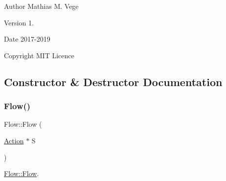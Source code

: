 \begin{DoxyAuthor}{Author}
Mathias M. Vege 
\end{DoxyAuthor}
\begin{DoxyVersion}{Version}
1. 
\end{DoxyVersion}
\begin{DoxyDate}{Date}
2017-\/2019 
\end{DoxyDate}
\begin{DoxyCopyright}{Copyright}
M\+IT Licence 
\end{DoxyCopyright}


\subsection{Constructor \& Destructor Documentation}
\mbox{\label{class_flow_a25ae85599c0ae330374f0840efde7ebc}} 
\subsubsection{\texorpdfstring{Flow()}{Flow()}}
{\footnotesize\ttfamily Flow\+::\+Flow (\begin{DoxyParamCaption}\item[{\mbox{\hyperlink{class_action}{Action}} $\ast$}]{S }\end{DoxyParamCaption})}



\mbox{\hyperlink{class_flow_a25ae85599c0ae330374f0840efde7ebc}{Flow\+::\+Flow}}. 


